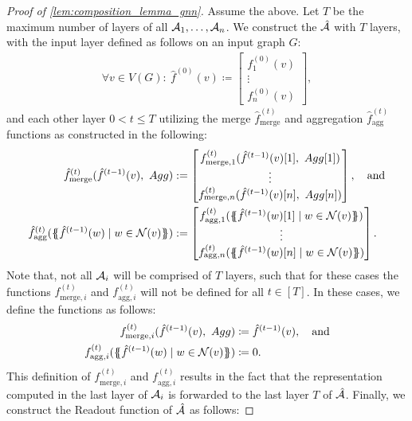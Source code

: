 \begin{proof}[Proof of \cref{lem:composition_lemma_gnn}]
    Assume the above. Let $T$ be the maximum number of layers of all $\mathcal{A}_1, \dots, \mathcal{A}_n$. We construct the \gnn $\hat{\mathcal{A}}$ with $T$ layers, with the input layer defined as follows on an input graph $G$:
    \begin{align*}
        \forall v \in V(G): \ \hat{f}^{(0)}(v) \coloneqq \begin{bmatrix}
            f^{(0)}_1(v)\\
            \vdots\\
            f^{(0)}_n(v)
        \end{bmatrix},
    \end{align*}
    and each other layer $0 < t \leq T$ utilizing the merge $\hat{f}^{(t)}_{\text{merge}}$ and aggregation $\hat{f}^{(t)}_{\text{agg}}$ functions as constructed in the following:
    \begin{align*}
        \hat{f}^{(t)}_{\text{merge}} (\hat{f}^{(t-1)}(v), \ Agg) &:= \begin{bmatrix}
            f^{(t)}_{\text{merge}, 1}(\hat{f}^{(t-1)}(v)[1],\ Agg[1])\\
            \vdots\\
            f^{(t)}_{\text{merge}, n}(\hat{f}^{(t-1)}(v)[n],\ Agg[n])
        \end{bmatrix},\quad \text{and}\\
        \hat{f}^{(t)}_{\text{agg}}(\MSopen \hat{f}^{(t-1)}(w) \mid w \in \mathcal{N}(v) \MSclose ) &:= \begin{bmatrix}
            f^{(t)}_{\text{agg}, 1}(\MSopen \hat{f}^{(t-1)}(w)[1] \mid w \in \mathcal{N}(v) \MSclose)\\
            \vdots\\
            f^{(t)}_{\text{agg}, n}(\MSopen \hat{f}^{(t-1)}(w)[n] \mid w \in \mathcal{N}(v) \MSclose)
        \end{bmatrix}.
    \end{align*}
    Note that, not all $\mathcal{A}_i$ will be comprised of $T$ layers, such that for these cases the functions $f^{(t)}_{\text{merge}, i}$ and $f^{(t)}_{\text{agg}, i}$ will not be defined for all $t \in [T]$. In these cases, we define the functions as follows:
    \begin{align*}
        f^{(t)}_{\text{merge}, i}(\hat{f}^{(t-1)}(v), \ Agg) &\coloneqq \hat{f}^{(t-1)}(v), \quad \text{and}\\
        f^{(t)}_{\text{agg}, i}(\{\!\!\{ \hat{f}^{(t-1)}(w) \mid w \in \mathcal{N}(v) \}\!\!\}) &\coloneqq 0.
    \end{align*}
    This definition of $f^{(t)}_{\text{merge}, i}$ and $f^{(t)}_{\text{agg}, i}$ results in the fact that the representation computed in the last layer of $\mathcal{A}_i$ is forwarded to the last layer $T$ of $\hat{\mathcal{A}}$. Finally, we construct the \textsf{Readout} function of $\hat{\mathcal{A}}$ as follows:

\end{proof}

